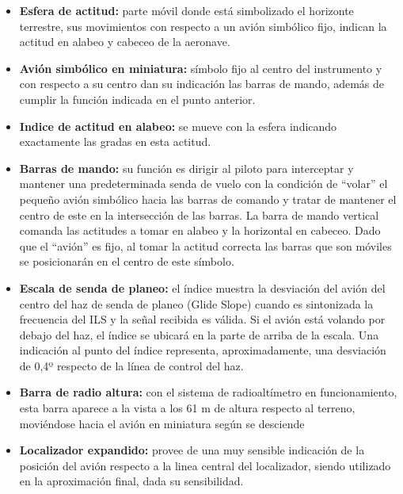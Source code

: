 \documentclass[a4paper,12pt,twoside]{article}
\begin{document}
\begin{itemize}
	\item {\bf Esfera de actitud: } parte m\'ovil donde est\'a simbolizado
	el horizonte terrestre, sus movimientos con respecto a un avi\'on simb\'olico
	fijo, indican la actitud en alabeo y cabeceo de la aeronave.

        \item {\bf Avi\'on simb\'olico en miniatura: } s\'imbolo fijo al centro del
	instrumento y con respecto a su centro dan su indicaci\'on las barras de mando, 
	adem\'as de cumplir la funci\'on indicada en el punto anterior.

        \item {\bf Indice de actitud en alabeo: } se mueve con la esfera indicando
	exactamente las gradas en esta actitud.

        \item {\bf Barras de mando: } su funci\'on es dirigir al piloto para interceptar
	y mantener una predeterminada senda de vuelo con la condici\'on de ``volar''
	el peque\~no avi\'on simb\'olico hacia las barras de comando y tratar de
	mantener el centro de este en la intersecci\'on de las barras.
	La barra de mando vertical comanda las actitudes a tomar en alabeo y la
	horizontal en cabeceo.
	Dado que el ``avi\'on'' es fijo, al tomar la actitud correcta las barras que
	son m\'oviles se posicionar\'an en el centro de este s\'imbolo.

        \item {\bf Escala de senda de planeo: }
	el \'indice muestra la desviaci\'on del avi\'on del centro del haz de senda de 
	planeo (Glide Slope) cuando es sintonizada la frecuencia del ILS y la se\~nal
	recibida es v\'alida. 
	Si el avi\'on est\'a volando por debajo del haz, el \'indice se ubicar\'a
	en la parte de arriba de la escala.
	Una indicaci\'on al punto del \'indice representa, aproximadamente,
	 una desviaci\'on de 0,4º
	respecto de la l\'inea de control del haz.

        \item {\bf Barra de radio altura: }
	con el sistema de radioalt\'imetro en funcionamiento, esta barra aparece
	a la vista a los 61 m de altura respecto al terreno, movi\'endose hacia el
	avi\'on en miniatura seg\'un se desciende 

        \item {\bf Localizador expandido: }
	provee de una muy sensible indicaci\'on de la posici\'on del avi\'on
	respecto a la linea central del localizador, siendo utilizado en la
	aproximaci\'on final, dada su sensibilidad.


\end{itemize}
\end{document}
